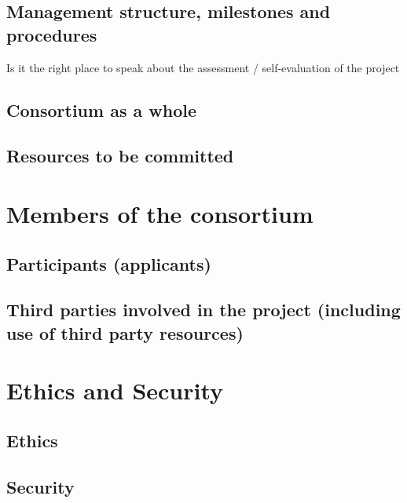 \documentclass[12pt]{book}
\begin{document}


\section{Management structure, milestones and procedures}

{\color{red} Is it the right place to speak about the assessment /
  self-evaluation of the project}



 
\section{Consortium as a whole}

\section{Resources to be committed}

\chapter{Members of the consortium}

\section{Participants (applicants)}



\section{Third parties involved in the project (including use of third party resources)}


\chapter{Ethics and Security}

\section{Ethics}

\section{Security}








\end{document}
